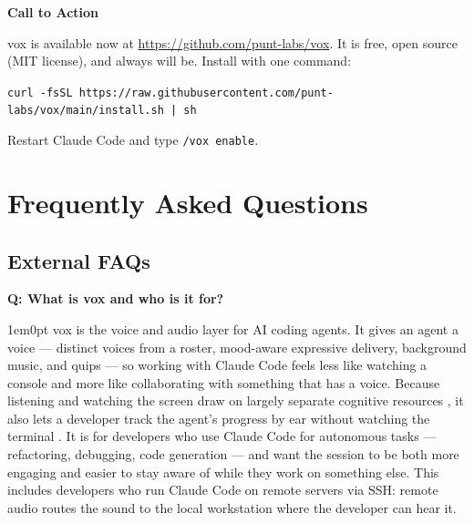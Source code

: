 \documentclass[11pt,letterpaper]{article}
\newcommand{\prsection}[1]{%
  \vspace{1em}%
  {\large\bfseries\color{SectionBlue}#1}%
  \vspace{0.3em}\par%
}
\newcounter{faqnum}
\newenvironment{faqpair}[1]{%
  \needspace{4\baselineskip}%
  \vspace{0.5em}%
  \refstepcounter{faqnum}%
  \noindent\textbf{\color{SectionBlue}Q\thefaqnum: #1}\par\nopagebreak[4]%
  \vspace{0.2em}%
  \begin{adjustwidth}{1em}{0pt}%
  \setlength{\parindent}{0pt}%
}{%
  \end{adjustwidth}%
  \vspace{0.5em}%
}
\begin{document}
\prsection{Call to Action}

vox is available now at
\url{https://github.com/punt-labs/vox}. It is free, open source (MIT license),
and always will be. Install with one command:

{\small\texttt{curl -fsSL https://raw.githubusercontent.com/punt-labs/vox/main/install.sh | sh}}

Restart Claude Code and type \texttt{/vox enable}.

\newpage


\section*{Frequently Asked Questions}


\subsection*{External FAQs}

\begin{faqpair}{What is vox and who is it for?}\label{faq:what}
  vox is the voice and audio layer for AI coding agents. It gives an
  agent a voice --- distinct voices from a roster, mood-aware expressive
  delivery, background music, and quips --- so working with Claude Code feels
  less like watching a console and more like collaborating with something that
  has a voice. Because listening and watching the screen draw on largely
  separate cognitive resources
  \cite{baddeleyhitch1974workingmemory,baddeley2000episodicbuffer}, it also
  lets a developer track the agent's progress by ear without watching the
  terminal \cite{springer2016audiovisual,mccrickardchewar2003attuning}.
  It is for
  developers who use Claude Code for autonomous tasks --- refactoring,
  debugging, code generation --- and want the session to be both more engaging
  and easier to stay aware of while they work on something else. This includes
  developers who run Claude Code on remote servers via SSH: remote audio
  routes the sound to the local workstation where the developer can hear it.
\end{faqpair}
\end{document}
